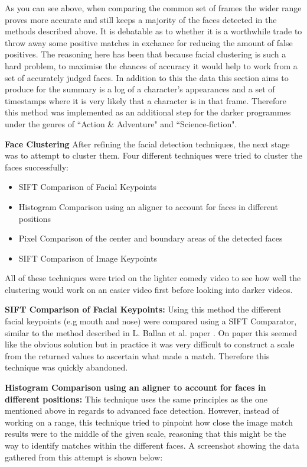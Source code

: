As you can see above, when comparing the common set of frames the wider range proves more accurate and still keeps a majority of the 
faces detected in the methods described above. It is debatable as to whether it is a worthwhile trade to throw away some positive matches in 
exchance for reducing the amount of false positives. The reasoning here has been that because facial clustering is such a hard problem, to 
maximise the chances of accuracy it would help to work from a set of accurately judged faces. In addition to this the data this section aims 
to produce for the summary is a log of a character's appearances and a set of timestamps where it is very likely that a character is in that frame. 
Therefore this method was implemented as an additional step for the darker programmes under the genres of ``Action \& Adventure" and ``Science-fiction".

\newpage
\textbf{Face Clustering}
\newline
After refining the facial detection techniques, the next stage was to attempt to cluster them. Four different techniques were tried to cluster the faces successfully:
\begin{itemize}
	\item{SIFT Comparison of Facial Keypoints}
	\item{Histogram Comparison using an aligner to account for faces in different positions}
	\item{Pixel Comparison of the center and boundary areas of the detected faces}
	\item{SIFT Comparison of Image Keypoints}
\end{itemize}

All of these techniques were tried on the lighter comedy video to see how well the clustering would work on an easier video first before looking into darker videos. 

\textbf{SIFT Comparison of Facial Keypoints:} Using this method the different facial keypoints (e.g mouth and nose) were compared using a SIFT 
Comparator, similar to the method described in L. Ballan et al. paper \cite{football}. On paper this seemed like the obvious solution but in practice it was 
very difficult to construct a scale from the returned values to ascertain what made a match. Therefore this technique was quickly abandoned.

\textbf{Histogram Comparison using an aligner to account for faces in different positions:} This technique uses the same principles as the one mentioned above in regards to advanced face detection. However, instead of working on a range, this technique tried to pinpoint how close the image match results were to the middle of the given scale, reasoning that this might be the way to identify matches within the different faces. A screenshot showing the data gathered from this attempt is shown below:

